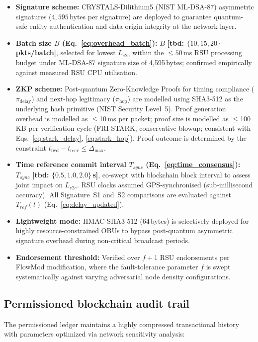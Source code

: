 \documentclass[12pt, a4paper]{report}
\begin{document}
{{\begin{itemize}
    \item \textbf{Signature scheme:} CRYSTALS-Dilithium5 (NIST ML-DSA-87) asymmetric signatures ($4,595$\,bytes per signature) are deployed to guarantee quantum-safe entity authentication and data origin integrity at the network layer.
    
    \item \textbf{Batch size $B$
    (Eq.~\ref{eq:overhead_batch}):}
    $B$ \textbf{[tbd: $\{10, 15, 20\}$\,pkts/batch]},
    selected for lowest $L_{e2e}$ within the
    $\leq 50$\,ms RSU processing budget under
    ML-DSA-87 signature size of 4{,}595\,bytes;
    confirmed empirically against measured RSU
    CPU utilisation.
   

    \item \textbf{ZKP scheme:} Post-quantum Zero-Knowledge Proofs for timing
    compliance ($\pi_{\text{delay}}$) and next-hop legitimacy ($\pi_{\text{hop}}$)
    are modelled using SHA3-512 as the underlying hash primitive (NIST Security
    Level~5). Proof generation overhead is modelled as $\leq$10\,ms per packet;
    proof size is modelled as $\leq$100\,KB per
  verification cycle (FRI-STARK, conservative
  blowup; consistent with Eqs.~\ref{eq:stark_delay},
    \ref{eq:stark_hop}).
 Proof outcome
    is determined by the constraint $t_{\text{fwd}} - t_{\text{recv}} \leq
    \Delta_{\max}$.
    
\item \textbf{Time reference commit interval
    $T_{sync}$ (Eq.~\ref{eq:time_consensus}):}
    $T_{sync}$ \textbf{[tbd:
    $\{0.5, 1.0, 2.0\}$\,s]}, co-swept with
    blockchain block interval to assess joint
    impact on $L_{e2e}$. RSU clocks assumed
    GPS-synchronised (sub-millisecond accuracy).
    All Signature~S1 and~S2 comparisons are
    evaluated against $T_{ref}(t)$
    (Eq.~\ref{eq:delay_updated}).

    \item \textbf{Lightweight mode:} HMAC-SHA3-512 ($64$\,bytes) is selectively deployed for highly resource-constrained OBUs to bypass post-quantum asymmetric signature overhead during non-critical broadcast periods.
    \item \textbf{Endorsement threshold:} Verified over $f+1$ RSU endorsements per FlowMod modification, where the fault-tolerance parameter $f$ is swept systematically against varying adversarial node density configurations.
\end{itemize}

\subsection{Permissioned blockchain audit trail}
The permissioned ledger maintains a highly compressed transactional history with parameters optimized via network sensitivity analysis:

}}
\end{document}
